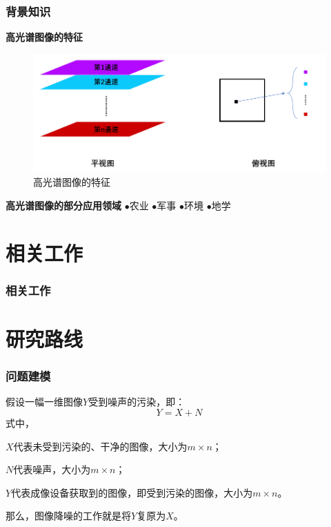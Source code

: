 \documentclass[10pt,aspectratio=43,mathserif]{beamer}
\begin{document}
\begin{frame}
\frametitle{\textbf{背景知识}}
\begin{block}{\textbf{高光谱图像的特征}}
\begin{figure}[H]
\centering
\includegraphics[scale=0.5]{img-characterofphotograph.png}
\caption{高光谱图像的特征}
\end{figure}
\end{block}
    	
\begin{block}{\textbf{高光谱图像的部分应用领域}}
$\bullet$农业 \qquad 
$\bullet$军事 \qquad 
$\bullet$环境 \qquad 
$\bullet$地学
\end{block}
\end{frame}

\section[相关工作]{相关工作}
\begin{frame}
\frametitle{\textbf{相关工作}}
	
\end{frame}

\section[研究路线]{研究路线}
\begin{frame}
\frametitle{\textbf{问题建模}}
\par 假设一幅一维图像$Y$受到噪声的污染，即：
\begin{displaymath}
Y = X + N
\end{displaymath}
式中，
\par$X$代表未受到污染的、干净的图像，大小为$m \times n$；
\par$N$代表噪声，大小为$m \times n$；
\par$Y$代表成像设备获取到的图像，即受到污染的图像，大小为$m \times n$。
\newline
\par 那么，图像降噪的工作就是将$Y$复原为$X$。
\end{frame}
\end{document}
